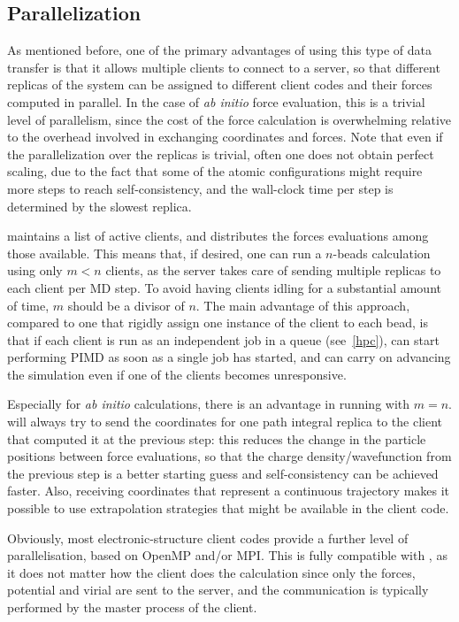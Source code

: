\documentclass[11pt,english,fleqn]{report}
\begin{document}
\subsection{Parallelization}

As mentioned before, one of the primary advantages of using this type
of data transfer is that it allows multiple clients to connect
to a \ipi server, so that different replicas of the system can be
assigned to different client codes and their forces computed in parallel.
In the case of \emph{ab initio} force evaluation, this is a trivial
level of parallelism, since the cost of the force calculation
is overwhelming relative to the overhead involved in exchanging 
coordinates and forces. Note that even if the parallelization over
the replicas is trivial, often one does not obtain perfect scaling,
due to the fact that some of the atomic configurations might require
more steps to reach self-consistency, and the wall-clock time per step
is determined by the slowest replica.

\ipi maintains a list of active clients, and distributes the forces
evaluations among those available. This means that, if desired, one 
can run a $n$-beads calculation using only $m<n$ clients, as the 
server takes care of sending multiple replicas to each client per 
MD step. To avoid having clients idling for a substantial amount
of time, $m$ should be a divisor of $n$. The main advantage of 
this approach, compared to one that rigidly assign one instance of
the client to each bead, is that if each client is run as an independent
job in a queue (see~\ref{hpc}), \ipi can start performing PIMD
as soon as a single job has started, and can carry on advancing the
simulation even if one of the clients becomes unresponsive.

Especially for \emph{ab initio} calculations, there is an advantage
in running with $m=n$. \ipi will always try to send the coordinates for one
path integral replica to the client that computed it at the previous 
step: this reduces the change in the particle positions between 
force evaluations, so that the charge density/wavefunction from the 
previous step is a better starting guess and self-consistency can be 
achieved faster. Also, receiving coordinates that represent a continuous
trajectory makes it possible to use extrapolation
strategies that might be available in the client code.

Obviously, most electronic-structure client codes provide a further level
of parallelisation, based on OpenMP and/or MPI. This is fully compatible with
\ipi, as it does not matter how the client does the calculation since
only the forces, potential and virial are sent to the server, and the communication
is typically performed by the master process of the client. 
\end{document}
